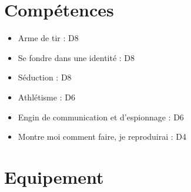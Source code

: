 \begin{multicols}{2}
\section*{Compétences}

\begin{itemize}
\item Arme de tir : D8
\item Se fondre dans une identité : D8
\item Séduction : D8
\item Athlétisme : D6
\item Engin de communication et d'espionnage : D6
\item Montre moi comment faire, je reproduirai : D4
\end{itemize}

\section*{Equipement}

\end{multicols}

\clearpage
